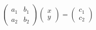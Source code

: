 \documentclass[preview]{standalone}
\begin{document}
\begin{align*}
\begin{pmatrix} a_1 & b_1 \\ a_2 & b_2 \end{pmatrix} \begin{pmatrix} x \\ y \end{pmatrix} = \begin{pmatrix} c_1\\ c_2 \end{pmatrix}
\end{align*}
\end{document}
